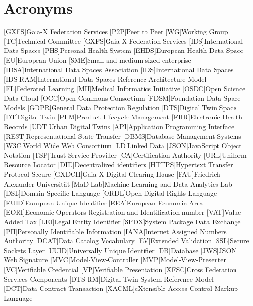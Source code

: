 \chapter{Acronyms}
\begin{acronym}
    [GXFS]{Gaia-X Federation Services}
    [P2P]{Peer to Peer}
    [WG]{Working Group}
    [TC]{Technical Committee}
    [GXFS]{Gaia-X Federation Services}
    [IDS]{International Data Spaces}
    [PHS]{Personal Health System}
    [EHDS]{European Health Data Space}
    [EU]{European Union}
    [SME]{Small and medium-sized enterprise}
    [IDSA]{International Data Spaces Association}
    [IDS]{International Data Spaces}
    [IDS-RAM]{International Data Spaces Reference Architecture Model}
    [FL]{Federated Learning}
    [MII]{Medical Informatics Initiative}
    [OSDC]{Open Science Data Cloud}
    [OCC]{Open Commons Consortium}
    [FDSM]{Foundation Data Space Models}
    [GDPR]{General Data Protection Regulation}
    [DTS]{Digital Twin Space}
    [DT]{Digital Twin}
    [PLM]{Product Lifecycle Management}
    [EHR]{Electronic Health Records}
    [UDT]{Urban Digital Twins}
    [API]{Application Programming Interface}
    [REST]{Representational State Transfer}
    [DBMS]{Database Management Systems}
    [W3C]{World Wide Web Consortium}
    [LD]{Linked Data}
    [JSON]{JavaScript Object Notation}
    [TSP]{Trust Service Provider}
    [CA]{Certification Authority}
    [URL]{Uniform Resource Locator}
    [DID]{Decentralized identifiers}
    [HTTPS]{Hypertext Transfer Protocol Secure}
    [GXDCH]{Gaia-X Digital Clearing House}
    [FAU]{Friedrich-Alexander-Universität}
    [MaD Lab]{Machine Learning and Data Analytics Lab}
    [DSL]{Domain Specific Language}
    [ORDL]{Open Digital Rights Language}
    [EUID]{European Unique Identifier}
    [EEA]{European Economic Area}
    [EORI]{Economic Operators Registration and Identification number}
    [VAT]{Value Added Tax}
    [LEI]{Legal Entity Identifier}
    [SPDX]{System Package Data Exchange}
    [PII]{Personally Identifiable Information}
    [IANA]{Internet Assigned Numbers Authority}
    [DCAT]{Data Catalog Vocabulary}
    [EV]{Extended Validation}
    [SSL]{Secure Sockets Layer}
    [UUID]{Universally Unique Identifier}
    [DB]{Database}
    [JWS]{JSON Web Signature}
    [MVC]{Model-View-Controller}
    [MVP]{Model-View-Presenter}
    [VC]{Verifiable Credential}
    [VP]{Verifiable Presentation}
    [XFSC]{Cross Federation Services Components}
    [DTS-RM]{Digital Twin System Reference Model}
    [DCT]{Data Contract Transaction}
    [XACML]{eXtensible Access Control Markup Language}
\end{acronym}%
